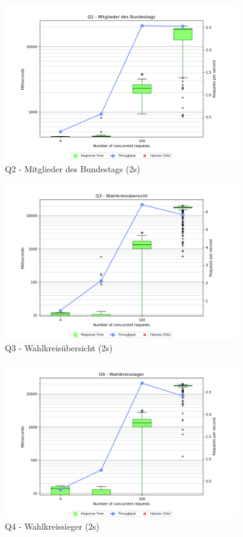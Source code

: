 \documentclass[a4paper]{scrreprt}
\begin{document}
\begin{figure}[h]
\centering
\includegraphics[width=0.9\textwidth]{images/plots_2s/Q2}
\caption {Q2 - Mitglieder des Bundestags (2s)}
\end{figure}

\begin{figure}[h]
\centering
\includegraphics[width=0.9\textwidth]{images/plots_2s/Q3}
\caption {Q3 - Wahlkreisübersicht (2s)}
\end{figure}

\begin{figure}[h]
\centering
\includegraphics[width=0.9\textwidth]{images/plots_2s/Q4}
\caption {Q4 - Wahlkreissieger (2s)}
\end{figure}
\end{document}
